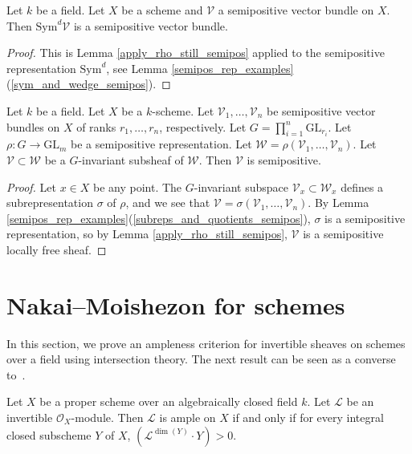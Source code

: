 \begin{lemma}\label{symd_semipos}
Let $k$ be a field.
Let $X$ be a scheme and $\mathcal{V}$ a semipositive vector bundle on $X$.
Then $\mathrm{Sym}^d\mathcal{V}$ is a semipositive vector bundle.
\end{lemma}
\begin{proof}
This is Lemma \ref{apply_rho_still_semipos} applied to the semipositive
representation $\mathrm{Sym}^d$, see Lemma
\ref{semipos_rep_examples}(\ref{sym_and_wedge_semipos}).
\end{proof}


\begin{lemma}
Let $k$ be a field.
Let $X$ be a $k$-scheme.
Let $\mathcal{V}_1,\ldots,\mathcal{V}_n$ be semipositive vector bundles on $X$
of ranks $r_1,\ldots,r_n$, respectively.
Let $G = \prod_{i=1}^n \mathrm{GL}_{r_i}$.
Let $\rho : G \to \mathrm{GL}_m$ be a semipositive representation.
Let $\mathcal{W} = \rho(\mathcal{V}_1,\ldots,\mathcal{V}_n)$.
Let $\mathcal{V} \subset \mathcal{W}$ be a $G$-invariant subsheaf of $\mathcal{W}$.
Then $\mathcal{V}$ is semipositive.
\end{lemma}

\begin{proof}
Let $x\in X$ be any point.
The $G$-invariant subspace $\mathcal{V}_x \subset \mathcal{W}_x$ defines a
subrepresentation $\sigma$ of $\rho$, and we see that
$\mathcal{V} = \sigma(\mathcal{V}_1,\ldots,\mathcal{V}_n)$.
By Lemma \ref{semipos_rep_examples}(\ref{subreps_and_quotients_semipos}),
$\sigma$ is a semipositive representation, so by Lemma
\ref{apply_rho_still_semipos}, $\mathcal{V}$ is a semipositive locally free
sheaf.
\end{proof}

\section{Nakai--Moishezon for schemes}
In this section, we prove an ampleness criterion for invertible sheaves on
schemes over a field using intersection theory.
The next result can be seen as a converse to~.

\begin{lemma}
\label{schemes-lemma-nakai-moishezon}
Let $X$ be a proper scheme over an algebraically closed field $k$.
Let $\mathcal{L}$ be an invertible $\mathcal{O}_X$-module.
Then $\mathcal{L}$ is ample on $X$ if and only if
for every integral closed subscheme $Y$ of $X$,
$(\mathcal{L}^{\dim(Y)} \cdot Y) > 0$.
\end{lemma}

